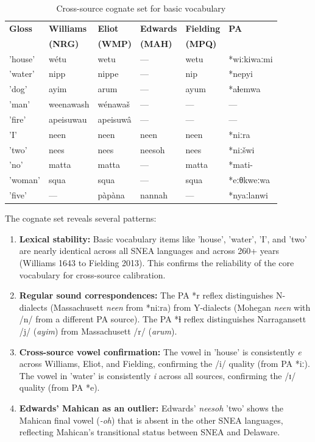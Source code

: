 \begin{table}[h]
\centering
\caption{Cross-source cognate set for basic vocabulary}
\label{tab:cognate-set}
\small
\begin{tabular}{llllll}
\toprule
\textbf{Gloss} & \textbf{Williams} & \textbf{Eliot} & \textbf{Edwards} & \textbf{Fielding} & \textbf{PA} \\
 & \textbf{(NRG)} & \textbf{(WMP)} & \textbf{(MAH)} & \textbf{(MPQ)} & \\
\midrule
'house' & wétu & wetu & --- & wetu & *wiːkiwaːmi \\
'water' & nipp & nippe & --- & nip & *nepyi \\
'dog' & ayim & arum & --- & ayum & *aɬemwa \\
'man' & weenawash & wénawaš & --- & --- & --- \\
'fire' & apeisuwau & apeisuwâ & --- & --- & --- \\
'I' & neen & neen & neen & neen & *niːra \\
'two' & nees & nees & neesoh & nees & *niːšwi \\
'no' & matta & matta & --- & matta & *mati- \\
'woman' & squa & squa & --- & squa & *eːθkweːwa \\
'five' & --- & pàpàna & nannah & --- & *nyaːlanwi \\
\bottomrule
\end{tabular}
\end{table}

The cognate set reveals several patterns:

\begin{enumerate}
  \item \textbf{Lexical stability:} Basic vocabulary items like 'house',
    'water', 'I', and 'two' are nearly identical across all SNEA languages
    and across 260+ years (Williams 1643 to Fielding 2013). This confirms
    the reliability of the core vocabulary for cross-source calibration.

  \item \textbf{Regular sound correspondences:} The PA *r reflex distinguishes
    N-dialects (Massachusett \textit{neen} from *niːra) from Y-dialects
    (Mohegan \textit{neen} with /n/ from a different PA source). The PA *ɬ
    reflex distinguishes Narragansett /j/ (\textit{ayim}) from Massachusett
    /r/ (\textit{arum}).

  \item \textbf{Cross-source vowel confirmation:} The vowel in 'house' is
    consistently \textit{e} across Williams, Eliot, and Fielding, confirming
    the /i/ quality (from PA *iː). The vowel in 'water' is consistently
    \textit{i} across all sources, confirming the /ɪ/ quality (from PA *e).

  \item \textbf{Edwards' Mahican as an outlier:} Edwards' \textit{neesoh}
    'two' shows the Mahican final vowel (\textit{-oh}) that is absent in the
    other SNEA languages, reflecting Mahican's transitional status between
    SNEA and Delaware.
\end{enumerate}

